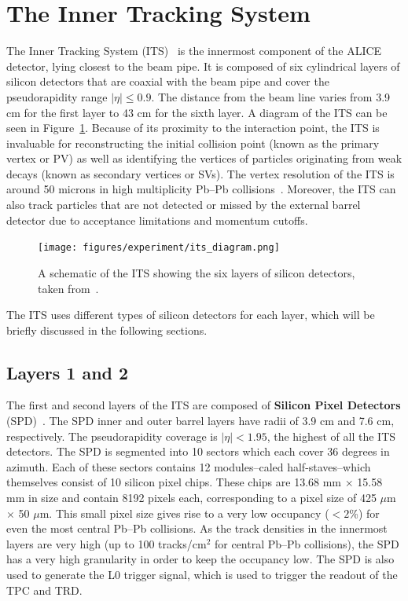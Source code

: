 \section{The Inner Tracking System}
\label{sec:its}

The Inner Tracking System (ITS)~\cite{ITS} is the innermost component of the ALICE detector, lying closest to the beam pipe. It is composed of six cylindrical layers of silicon detectors that are coaxial with the beam pipe and cover the pseudorapidity range $|\eta| \leq 0.9$. The distance from the beam line varies from 3.9 cm for the first layer to 43 cm for the sixth layer. A diagram of the ITS can be seen in Figure~\ref{fig:its_schematic}. Because of its proximity to the interaction point, the ITS is invaluable for reconstructing the initial collision point (known as the primary vertex or PV) as well as identifying the vertices of particles originating from weak decays (known as secondary vertices or SVs). The vertex resolution of the ITS is around 50 microns in high multiplicity Pb--Pb collisions~\cite{ITSVertex}. Moreover, the ITS can also track particles that are not detected or missed by the external barrel detector due to acceptance limitations and momentum cutoffs. 

\begin{figure}
    \centering
    \texttt{[image: figures/experiment/its\_diagram.png]}
    \caption{A schematic of the ITS showing the six layers of silicon detectors, taken from~\cite{ITSDiagram}.}
    \label{fig:its_schematic}
\end{figure}

The ITS uses different types of silicon detectors for each layer, which will be briefly discussed in the following sections.

\subsection{Layers 1 and 2}

The first and second layers of the ITS are composed of \textbf{Silicon Pixel Detectors} (SPD)~\cite{ITSSPD}. The SPD inner and outer barrel layers have radii of 3.9 cm and 7.6 cm, respectively. The pseudorapidity coverage is $|\eta| < 1.95$, the highest of all the ITS detectors. The SPD is segmented into 10 sectors which each cover 36 degrees in azimuth. Each of these sectors contains 12 modules--caled half-staves--which themselves consist of 10 silicon pixel chips. These chips are 13.68 mm $\times$ 15.58 mm in size and contain 8192 pixels each, corresponding to a pixel size of 425 $\mu$m $\times$ 50 $\mu$m. This small pixel size gives rise to a very low occupancy ($<2$\%) for even the most central Pb--Pb collisions.  As the track densities in the innermost layers are very high (up to 100 tracks/cm$^2$ for central Pb--Pb collisions), the SPD has a very high granularity in order to keep the occupancy low. The SPD is also used to generate the L0 trigger signal, which is used to trigger the readout of the TPC and TRD.

